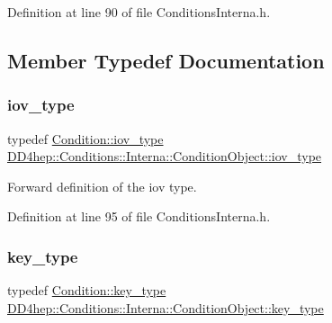 Definition at line 90 of file Conditions\+Interna.\+h.



\subsection{Member Typedef Documentation}
\hypertarget{class_d_d4hep_1_1_conditions_1_1_interna_1_1_condition_object_a6d54716450a73a1a439ca06445f56d24}{}\label{class_d_d4hep_1_1_conditions_1_1_interna_1_1_condition_object_a6d54716450a73a1a439ca06445f56d24} 
\subsubsection{\texorpdfstring{iov\+\_\+type}{iov\_type}}
{\footnotesize\ttfamily typedef \hyperlink{class_d_d4hep_1_1_conditions_1_1_condition_ad84300e226b2085ec5e9db7f47be5539}{Condition\+::iov\+\_\+type} \hyperlink{class_d_d4hep_1_1_conditions_1_1_interna_1_1_condition_object_a6d54716450a73a1a439ca06445f56d24}{D\+D4hep\+::\+Conditions\+::\+Interna\+::\+Condition\+Object\+::iov\+\_\+type}}



Forward definition of the iov type. 



Definition at line 95 of file Conditions\+Interna.\+h.

\hypertarget{class_d_d4hep_1_1_conditions_1_1_interna_1_1_condition_object_a61a3251d047bd75dcdebb0e1c1409101}{}\label{class_d_d4hep_1_1_conditions_1_1_interna_1_1_condition_object_a61a3251d047bd75dcdebb0e1c1409101} 
\subsubsection{\texorpdfstring{key\+\_\+type}{key\_type}}
{\footnotesize\ttfamily typedef \hyperlink{class_d_d4hep_1_1_conditions_1_1_condition_a7528efa762e8cc072ef80ea67c3531f9}{Condition\+::key\+\_\+type} \hyperlink{class_d_d4hep_1_1_conditions_1_1_interna_1_1_condition_object_a61a3251d047bd75dcdebb0e1c1409101}{D\+D4hep\+::\+Conditions\+::\+Interna\+::\+Condition\+Object\+::key\+\_\+type}}



